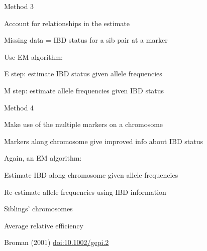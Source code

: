 \documentclass[aspectratio=169,12pt,t]{beamer}
\begin{document}
\begin{frame}{Method 3}

{\hilit Account for relationships in the estimate}

\bigskip \bigskip

Missing data = IBD status for a sib pair at a marker

\bigskip \bigskip

Use {\vhilit EM algorithm}:

\bigskip

\hspace*{15mm} \begin{minipage}{8in}
\bi
\item[\hilit E step:] estimate IBD status given allele frequencies

\item[\hilit M step:] estimate allele frequencies given IBD status
\ei
\end{minipage}


\note{
}

\end{frame}




\begin{frame}{Method 4}

{\hilit Make use of the multiple markers on a chromosome}

\bbi
\item Markers along chromosome give improved info
  about IBD status
\item Again, an EM algorithm:
  \bi
\item Estimate IBD along chromosome given allele frequencies
\item Re-estimate allele frequencies using IBD information
  \ei
\ei



\note{
}

\end{frame}



\begin{frame}{Siblings' chromosomes}

\note{
}

\end{frame}





\begin{frame}{Average relative efficiency}

\vspace{10mm}

\hfill \footnotesize {\lolit Broman (2001)
  \href{https://doi.org/10.1002/gepi.2}{doi:10.1002/gepi.2}}


\note{
}

\end{frame}
\end{document}
